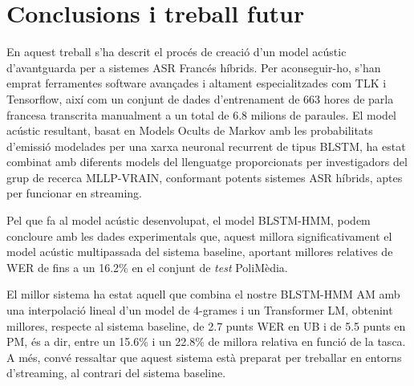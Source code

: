 
\chapter{Conclusions i treball futur}
\label{cap06__}


En aquest treball s'ha descrit el procés de creació d'un model acústic d'avantguarda per a sistemes ASR Francés híbrids. Per aconseguir-ho, s'han emprat ferramentes software avançades i altament especialitzades com TLK i Tensorflow, així com un conjunt de dades d'entrenament de 663 hores de parla francesa transcrita manualment a un total de $6.8$ milions de paraules. 
El model acústic resultant, basat en Models Ocults de Markov amb les probabilitats d'emissió modelades per una xarxa neuronal recurrent de tipus BLSTM, ha estat combinat amb diferents models del llenguatge proporcionats per investigadors del grup de recerca MLLP-VRAIN, conformant potents sistemes ASR híbrids, aptes per funcionar en streaming.

Pel que fa al model acústic desenvolupat, el model BLSTM-HMM, podem concloure amb les dades experimentals que, aquest millora significativament el model acústic multipassada del sistema baseline, aportant millores relatives de WER de fins a un 16.2\% en el conjunt de \textit{test} PoliMèdia.

El millor sistema ha estat aquell que combina el nostre BLSTM-HMM AM amb una interpolació lineal d'un model de 4-grames i un Transformer LM, obtenint millores, respecte al sistema baseline, de 2.7 punts WER en UB i de 5.5 punts en PM, és a dir, entre un 15.6\% i un 22.8\% de millora relativa en funció de la tasca. A més, convé ressaltar que aquest sistema està preparat per treballar en entorns d'streaming, al contrari del sistema baseline.


